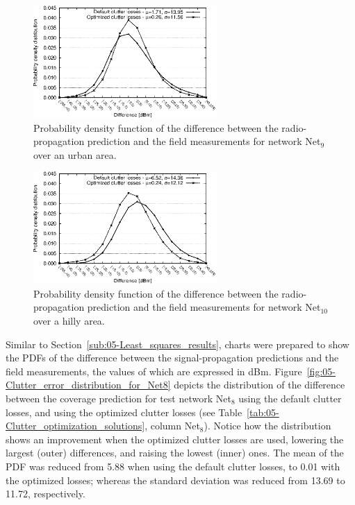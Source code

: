 \begin{figure}
\centering

\includegraphics[width=0.62\textwidth]{05-framework_parameter_tuning/img/urban-diff_distribution}

\caption{Probability density function of the difference between the radio-propagation
prediction and the field measurements for network Net$_{9}$ over
an urban area.\label{fig:05-Clutter_error_distribution_for_Net9}}


\vspace{-0.5cm}
\end{figure}


\begin{figure}
\centering

\includegraphics[width=0.62\textwidth]{05-framework_parameter_tuning/img/hilly-diff_distribution}

\caption{Probability density function of the difference between the radio-propagation
prediction and the field measurements for network Net$_{10}$ over
a hilly area.\label{fig:05-Clutter_error_distribution_for_Net10}}
\end{figure}


Similar to Section~\ref{sub:05-Least_squares_results}, charts were
prepared to show the PDFs of the difference between the signal-propagation
predictions and the field measurements, the values of which are expressed
in dBm. Figure~\ref{fig:05-Clutter_error_distribution_for_Net8}
depicts the distribution of the difference between the coverage prediction
for test network Net$_{8}$ using the default clutter losses, and
using the optimized clutter losses (see Table~\ref{tab:05-Clutter_optimization_solutions},
column Net$_{8}$). Notice how the distribution shows an improvement
when the optimized clutter losses are used, lowering the largest (outer)
differences, and raising the lowest (inner) ones. The mean of the
PDF was reduced from 5.88 when using the default clutter losses, to
0.01 with the optimized losses; whereas the standard deviation was
reduced from 13.69 to 11.72, respectively.

